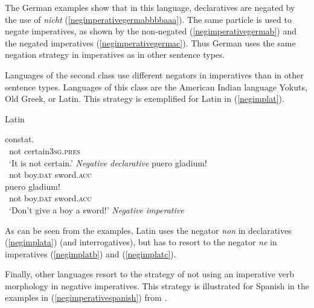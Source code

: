 \noindent The German examples show that in this language, declaratives are negated by the use of \textit{nicht} (\ref{negimperativegermabbbbaaa}). The same particle is used to negate imperatives, as shown by the non-negated (\ref{negimperativegermab}) and the negated imperatives (\ref{negimperativegermac}). Thus German uses the same negation strategy in imperatives as in other sentence types.%

Languages of the second class use different negators in imperatives than in other sentence types. Languages of this class are the American Indian language Yokuts, Old Greek, or Latin. This strategy is exemplified for Latin in (\ref{negimplat}).

\begin{exe}
\ex Latin\label{negimplat}
\begin{xlist} 
\ex {} {constat.}\\
{\textcolor{white}{*}not} {certain\textsc{3sg.pres}} \\
\trans \textcolor{white}{*}`It is not certain.' \hfill{\textit{Negative declarative}} \label{negimplata}
\ex {} {puero} {gladium!}\\
{\textcolor{white}{*}not} {boy.\textsc{dat}} {sword.\textsc{acc}} \\
\label{negimplatb}
\ex {} {puero} {gladium!}\\
{\textcolor{white}{*}not} {boy.\textsc{dat}} {sword.\textsc{acc}} \\
\trans \textcolor{white}{*}`Don't give a boy a sword!' \hfill{\textit{Negative imperative}}\label{negimplatc} 

\end{xlist}
\end{exe} 

\noindent As can be seen from the examples, Latin uses the negator \textit{non} in declaratives (\ref{negimplata}) (and interrogatives), but has to resort to the negator \textit{ne} in imperatives (\ref{negimplatb}) and (\ref{negimplatc}). 

Finally, other languages resort to the strategy of not using an imperative verb morphology in negative imperatives. This strategy is illustrated for Spanish in the examples in (\ref{negimperativespanish}) from \citet[57--58]{van2007imperatives}.

